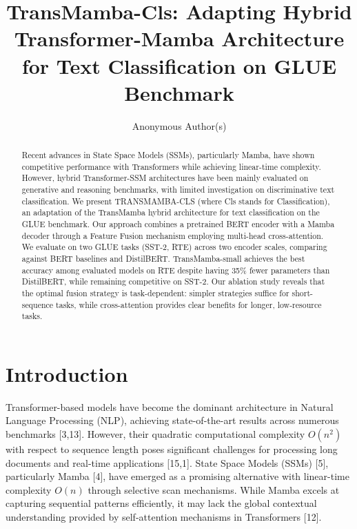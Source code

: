 \documentclass[runningheads]{llncs}
\begin{document}
\title{TransMamba-Cls: Adapting Hybrid Transformer-Mamba Architecture for Text Classification on GLUE Benchmark}

\author{Anonymous Author(s)}

\maketitle

\begin{abstract}
Recent advances in State Space Models (SSMs), particularly Mamba, have shown competitive performance with Transformers while achieving linear-time complexity. However, hybrid Transformer-SSM architectures have been mainly evaluated on generative and reasoning benchmarks, with limited investigation on discriminative text classification. We present TRANSMAMBA-CLS (where Cls stands for Classification), an adaptation of the TransMamba hybrid architecture for text classification on the GLUE benchmark. Our approach combines a pretrained BERT encoder with a Mamba decoder through a Feature Fusion mechanism employing multi-head cross-attention. We evaluate on two GLUE tasks (SST-2, RTE) across two encoder scales, comparing against BERT baselines and DistilBERT. TransMamba-small achieves the best accuracy among evaluated models on RTE despite having 35\% fewer parameters than DistilBERT, while remaining competitive on SST-2. Our ablation study reveals that the optimal fusion strategy is task-dependent: simpler strategies suffice for short-sequence tasks, while cross-attention provides clear benefits for longer, low-resource tasks.

\end{abstract}

\section{Introduction}
Transformer-based models have become the dominant architecture in Natural Language Processing (NLP), achieving state-of-the-art results across numerous benchmarks [3,13]. However, their quadratic computational complexity $O(n^{2})$ with respect to sequence length poses significant challenges for processing long documents and real-time applications [15,1]. State Space Models (SSMs) [5], particularly Mamba [4], have emerged as a promising alternative with linear-time complexity $O(n)$ through selective scan mechanisms. While Mamba excels at capturing sequential patterns efficiently, it may lack the global contextual understanding provided by self-attention mechanisms in Transformers [12]. 
\end{document}
